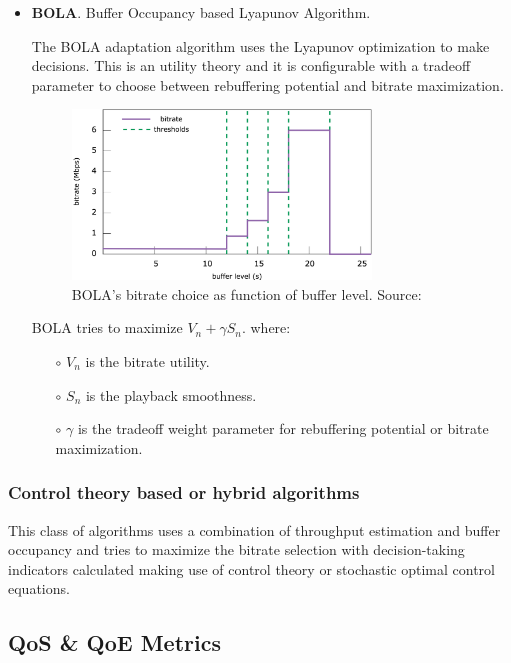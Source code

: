\begin{itemize}
  \item \textbf{BOLA}. Buffer Occupancy based Lyapunov Algorithm.
  
  The BOLA adaptation algorithm uses the Lyapunov optimization \cite{bola1} to make decisions. This is an utility 
  theory and it is configurable with a tradeoff parameter to choose between rebuffering potential and bitrate
  maximization.
  
  \begin{figure}[h]
    \centering
    \includegraphics[width=0.75\textwidth]{img/BOLA.png}
    \caption{BOLA's bitrate choice as function of buffer level. Source: \cite{bola1}}
    \label{fig:bola}
  \end{figure}

  BOLA tries to maximize ${V_{n}+\gamma S_{n}}$.
  where: 
  \begin{itemize}
    \item[$\circ$] \textbf{${V_{n}}$} is the bitrate utility.
    \item[$\circ$] \textbf{${S_{n}}$} is the playback smoothness.
    \item[$\circ$] \textbf{${\gamma}$} is the tradeoff weight parameter for rebuffering potential or bitrate
    maximization.
  \end{itemize}
\end{itemize}


\subsubsection{Control theory based or hybrid algorithms}

This class of algorithms uses a combination of throughput estimation and buffer occupancy and tries to 
maximize the bitrate selection with decision-taking indicators calculated making use of control theory or
stochastic optimal control equations.

\subsection{QoS \& QoE Metrics}
\label{sec:qoemetrics}


